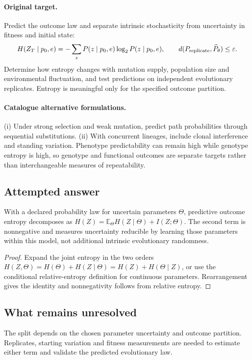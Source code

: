 \documentclass[11pt]{article}
\begin{document}
\paragraph{Original target.}
Predict the outcome law and separate intrinsic stochasticity from uncertainty in fitness and initial state:
\[
H(Z_T\mid p_0,e)=-\sum_zP(z\mid p_0,e)\log_2P(z\mid p_0,e),
\qquad
 d(P_{\rm replicate},\widehat P_\theta)\leq\varepsilon.
\]
Determine how entropy changes with mutation supply, population size and environmental fluctuation, and test predictions on independent evolutionary replicates. Entropy is meaningful only for the specified outcome partition.
\paragraph{Catalogue alternative formulations.}
(i) Under strong selection and weak mutation, predict path probabilities through sequential substitutions. (ii) With concurrent lineages, include clonal interference and standing variation. Phenotype predictability can remain high while genotype entropy is high, so genotype and functional outcomes are separate targets rather than interchangeable measures of repeatability.
\subsection{Attempted answer}
\begin{proposition}
With a declared probability law for uncertain parameters $\Theta$, predictive outcome entropy decomposes as $H(Z)=\mathbb{E}_\Theta H(Z\mid\Theta)+I(Z;\Theta)$. The second term is nonnegative and measures uncertainty reducible by learning those parameters within this model, not additional intrinsic evolutionary randomness.
\end{proposition}
\begin{proof}
Expand the joint entropy in the two orders $H(Z,\Theta)=H(\Theta)+H(Z\mid\Theta)=H(Z)+H(\Theta\mid Z)$, or use the conditional relative-entropy definition for continuous parameters. Rearrangement gives the identity and nonnegativity follows from relative entropy.
\end{proof}
\subsection{What remains unresolved}
The split depends on the chosen parameter uncertainty and outcome partition. Replicates, starting variation and fitness measurements are needed to estimate either term and validate the predicted evolutionary law.
\end{document}
